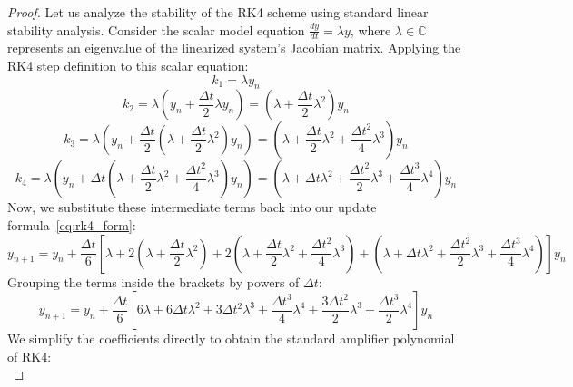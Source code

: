 \documentclass[11pt,a4paper]{book}
\begin{document}
\begin{proof}
Let us analyze the stability of the RK4 scheme using standard linear stability analysis. Consider the scalar model equation $\frac{dy}{dt} = \lambda y$, where $\lambda \in \mathbb{C}$ represents an eigenvalue of the linearized system's Jacobian matrix. 
Applying the RK4 step definition to this scalar equation:
\begin{equation}
\label{eq:sub_k1}
k_1 = \lambda y_n
\end{equation}
\begin{equation}
\label{eq:sub_k2}
k_2 = \lambda \left( y_n + \frac{\Delta t}{2}\lambda y_n \right) = \left( \lambda + \frac{\Delta t}{2}\lambda^2 \right) y_n
\end{equation}
\begin{equation}
\label{eq:sub_k3}
k_3 = \lambda \left( y_n + \frac{\Delta t}{2}\left( \lambda + \frac{\Delta t}{2}\lambda^2 \right) y_n \right) = \left( \lambda + \frac{\Delta t}{2}\lambda^2 + \frac{\Delta t^2}{4}\lambda^3 \right) y_n
\end{equation}
\begin{equation}
\label{eq:sub_k4}
k_4 = \lambda \left( y_n + \Delta t \left( \lambda + \frac{\Delta t}{2}\lambda^2 + \frac{\Delta t^2}{4}\lambda^3 \right) y_n \right) = \left( \lambda + \Delta t \lambda^2 + \frac{\Delta t^2}{2}\lambda^3 + \frac{\Delta t^3}{4}\lambda^4 \right) y_n
\end{equation}
Now, we substitute these intermediate terms back into our update formula~\eqref{eq:rk4_form}:
\begin{equation}
\label{eq:proof_rk4_1}
y_{n+1} = y_n + \frac{\Delta t}{6} \left[ \lambda + 2\left(\lambda + \frac{\Delta t}{2}\lambda^2\right) + 2\left(\lambda + \frac{\Delta t}{2}\lambda^2 + \frac{\Delta t^2}{4}\lambda^3\right) + \left(\lambda + \Delta t \lambda^2 + \frac{\Delta t^2}{2}\lambda^3 + \frac{\Delta t^3}{4}\lambda^4\right) \right] y_n
\end{equation}
Grouping the terms inside the brackets by powers of $\Delta t$:
\begin{equation}
\label{eq:proof_rk4_2}
y_{n+1} = y_n + \frac{\Delta t}{6} \left[ 6\lambda + 6\Delta t \lambda^2 + 3\Delta t^2 \lambda^3 + \frac{\Delta t^3}{4} \lambda^4 + \frac{3 \Delta t^2}{2} \lambda^3 + \frac{\Delta t^3}{2} \lambda^4 \right] y_n
\end{equation}
We simplify the coefficients directly to obtain the standard amplifier polynomial of RK4:
\begin{equation}
\label{eq:rk4_amplification}

\end{equation}
\end{proof}
\end{document}
